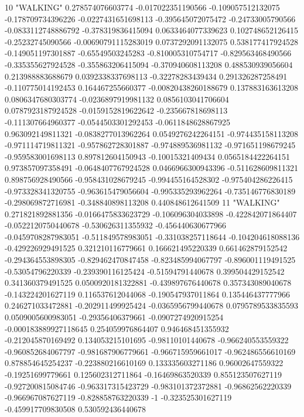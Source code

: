 10 "WALKING" 0.278574076603774 -0.017022351190566 -0.109057512132075 -0.178709734396226 -0.0227431651698113 -0.395645072075472 -0.24733005790566 -0.0833112748886792 -0.378319836415094 0.0633464077339623 0.102748652126415 -0.25232745090566 -0.00690791115283019 0.0737292091132075 0.538177417924528 -0.149051197301887 -0.65549503245283 -0.810005310754717 -0.829563468490566 -0.335355627924528 -0.355863206415094 -0.370940608113208 0.488530939056604 0.213988883688679 0.0392338337698113 -0.32278283439434 0.291326287258491 -0.110775014192453 0.164467255660377 -0.00820438260188679 0.137883163613208 0.0806347680303774 -0.0236897919981132 0.0856103041706604 0.0787923187924528 -0.0159152819622642 -0.235667818698113 -0.111307664960377 -0.0544503301292453 -0.0611848628867925 0.963092149811321 -0.0838277013962264 0.0549276242264151 -0.974435158113208 -0.971114719811321 -0.957862728301887 -0.974889536981132 -0.971651198679245 -0.959583001698113 0.897812604150943 -0.10015321409434 0.0565184422264151 0.973857097358491 -0.0648407767924528 0.0466966300943396 -0.511628609811321 0.898756928490566 -0.958431028679245 -0.994455164528302 -0.975404286226415 -0.973328341320755 -0.963615479056604 -0.995335293962264 -0.735146776830189 -0.298069872716981 -0.348840898113208 0.440848612641509
11 "WALKING" 0.271821892881356 -0.0166475833623729 -0.106096304033898 -0.422842071864407 -0.0522120750440678 -0.530626311355932 -0.456440630677966 -0.0459708287983051 -0.511849578983051 -0.331038257118644 -0.104204618088136 -0.429226929491525 0.321210116779661 0.166621495220339 0.661462879152542 -0.294364553898305 -0.829462470847458 -0.823485994067797 -0.896001119491525 -0.53054796220339 -0.239390116125424 -0.51594791440678 0.399504429152542 0.341360379491525 0.0500920181322881 -0.439897676440678 0.357343089040678 -0.143224201627119 0.116537612044068 -0.190547937011864 0.135446437777966 0.246271033472881 -0.202911499925424 -0.0365956799440678 0.0795789533835593 0.0509005600983051 -0.29356406379661 -0.0907274920915254 -0.000183889927118645 0.254059976864407 0.946468451355932 -0.212045870169492 0.134053215101695 -0.98110101440678 -0.966240553559322 -0.960852684067797 -0.981687906779661 -0.966715959661017 -0.962486556610169 0.878854645254237 -0.223880216610169 0.133335603271186 0.96002647559322 -0.19251699779661 0.125602312711864 -0.16469863520339 0.855123507627119 -0.927200815084746 -0.963317315423729 -0.983101372372881 -0.96862562220339 -0.966967087627119 -0.828858763220339 -1 -0.323525301627119 -0.459917709830508 0.530592436440678
